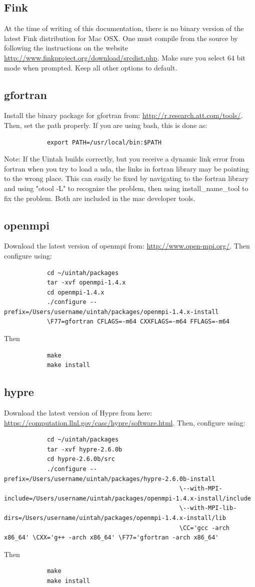 \documentclass[12pt]{article}
\begin{document}
	\subsection{Fink}
		At the time of writing of this documentation, there is no binary version of the latest Fink distribution for Mac OSX. One must compile from the source by following the instructions on the website \url{http://www.finkproject.org/download/srcdist.php}. Make sure you select 64 bit mode when prompted. Keep all other options to default.
	
	\subsection{gfortran}
		Install the binary package for gfortran from: \url{http://r.research.att.com/tools/}. Then, set the path properly. If you are using bash, this is done as:
		\begin{verbatim}
			export PATH=/usr/local/bin:$PATH
		\end{verbatim}
		Note: If the Uintah builds correctly, but you receive a dynamic link error from fortran when you try to load a uda, the links in fortran library may be pointing to the wrong place.  This can easily be fixed by navigating to the fortran library and using "otool -L" to recognize the problem, then using install\_name\_tool to fix the problem.  Both are included in the mac developer tools.
	
	\subsection{openmpi}
		Download the latest version of openmpi from: \url{http://www.open-mpi.org/}. Then configure using:
		\begin{verbatim}
			cd ~/uintah/packages
			tar -xvf openmpi-1.4.x
			cd openmpi-1.4.x
			./configure --prefix=/Users/username/uintah/packages/openmpi-1.4.x-install 
			\F77=gfortran CFLAGS=-m64 CXXFLAGS=-m64 FFLAGS=-m64
		\end{verbatim}
		Then
		\begin{verbatim}
			make
			make install
		\end{verbatim}
		
		\subsection{hypre}
		Download the latest version of Hypre from here: \url{https://computation.llnl.gov/casc/hypre/software.html}. Then, configure using:
		\begin{verbatim}
			cd ~/uintah/packages
			tar -xvf hypre-2.6.0b
			cd hypre-2.6.0b/src
			./configure --prefix=/Users/username/uintah/packages/hypre-2.6.0b-install 
												 \--with-MPI-include=/Users/username/uintah/packages/openmpi-1.4.x-install/include 
												 \--with-MPI-lib-dirs=/Users/username/uintah/packages/openmpi-1.4.x-install/lib 
												 \CC='gcc -arch x86_64' \CXX='g++ -arch x86_64' \F77='gfortran -arch x86_64' 
		\end{verbatim}
		Then
		\begin{verbatim}
			make
			make install
		\end{verbatim}
		
\end{document}
